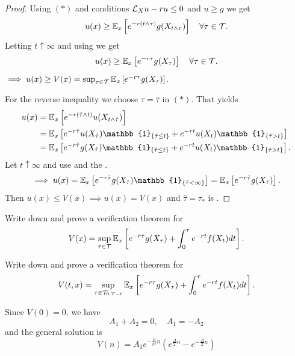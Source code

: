 \begin{proof}
    Using $(*)$ and conditions $\mathcal{L}_X u - ru \leq 0$ and $u \geq g$ we get
    \[ u(x) \geq \mathbb E_x \left[ e^{-r(t \wedge \tau)} g(X_{t \wedge \tau}) \right] \quad \forall \tau \in \mathcal{T}. \]
    Letting $t \uparrow \infty$ and using  we get
    \[ u(x) \geq \mathbb E_x \left[ e^{-r\tau} g(X_\tau) \right] \quad \forall \tau \in \mathcal{T}. \]
    $\implies u(x) \geq V(x) = \sup_{\tau \in \mathcal{T}} \mathbb E_x \left[ e^{-r\tau} g(X_\tau) \right]$.

    For the reverse inequality we choose $\tau = \hat{\tau}$ in $(*)$. That yields
    \begin{align*}
        u(x) &= \EE_x \left[ e^{-r(\hat{\tau} \wedge t)} u(X_{t \wedge \hat{\tau}}) \right] \\
        &= \EE_x \left[ e^{-r\hat{\tau}} u(X_{\hat{\tau}}) \mathbb{1}_{\{\hat{\tau} \leq t\}} + e^{-rt} u(X_t) \mathbb{1}_{\{\hat{\tau} > t\}} \right] \\
        &= \EE_x \left[ e^{-r\hat{\tau}} g(X_{\hat{\tau}}) \mathbb{1}_{\{\hat{\tau} \leq t\}} + e^{-rt} u(X_t) \mathbb{1}_{\{\hat{\tau} > t\}} \right].
    \end{align*}
    Let $t \uparrow \infty$ and use  and the .
    \[ \implies u(x) = \EE_x \left[ e^{-r\hat{\tau}} g(X_{\hat{\tau}}) \mathbb{1}_{\{\hat{\tau} < \infty\}} \right] = \EE_x \left[ e^{-r\hat{\tau}} g(X_{\hat{\tau}}) \right]. \]
    Then $u(x) \leq V(x) \implies u(x) = V(x)$ and $\hat{\tau} = \tau_*$ is .
\end{proof}

\begin{homework}
    Write down and prove a verification theorem for
    \[ V(x) = \sup_{\tau \in \mathcal{T}} \mathbb E_x \left[ e^{-r\tau} g(X_\tau) + \int_0^\tau e^{-rt} f(X_t) dt \right]. \]
\end{homework}

\begin{homework}
    Write down and prove a verification theorem for
    \[ V(t,x) = \sup_{\tau \in \mathcal{T}_{0, T-t}} \mathbb E_x \left[ e^{-r\tau} g(X_\tau) + \int_0^\tau e^{-rt} f(X_t) dt \right]. \]
\end{homework}

Since $V(0)=0$, we have
\begin{equation*}
    A_1 + A_2 = 0, \quad A_1 = -A_2
\end{equation*}
and the general solution is
\begin{equation*}
    V(n) = A_1 e^{-\frac{\mu}{\sigma^2}n} \left( e^{\frac{\Delta}{2}n} - e^{-\frac{\Delta}{2}n} \right)
\end{equation*}

